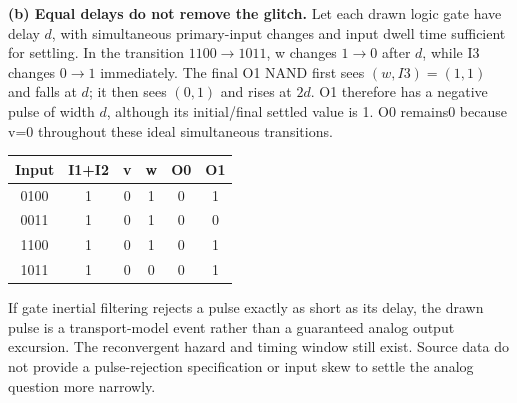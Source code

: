 \documentclass[10pt]{article}
\begin{document}
\newpage\textbf{(b) Equal delays do not remove the glitch.} Let each drawn logic gate have delay $d$, with simultaneous primary-input changes and input dwell time sufficient for settling. In the transition $1100\to1011$, w changes $1\to 0$ after $d$, while I3 changes $0\to1$ immediately. The final O1 NAND first sees $(w,I3)=(1,1)$ and falls at $d$; it then sees $(0,1)$ and rises at $2d$. O1 therefore has a negative pulse of width $d$, although its initial/final settled value is 1. O0 remains0 because v=0 throughout these ideal simultaneous transitions.
\begin{center}\end{center}
\begin{center}\begin{tabular}{cccccc}\toprule
Input&I1+I2&v&w&O0&O1\\\midrule
0100&1&0&1&0&1\\0011&1&0&1&0&0\\1100&1&0&1&0&1\\1011&1&0&0&0&1\\\bottomrule\end{tabular}\end{center}
If gate inertial filtering rejects a pulse exactly as short as its delay, the drawn pulse is a transport-model event rather than a guaranteed analog output excursion. The reconvergent hazard and timing window still exist. Source data do not provide a pulse-rejection specification or input skew to settle the analog question more narrowly.
\end{document}
